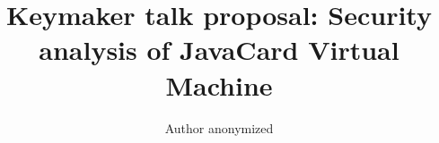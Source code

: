 \title{Keymaker talk proposal: Security analysis of JavaCard Virtual Machine}
\author{Author anonymized} %
